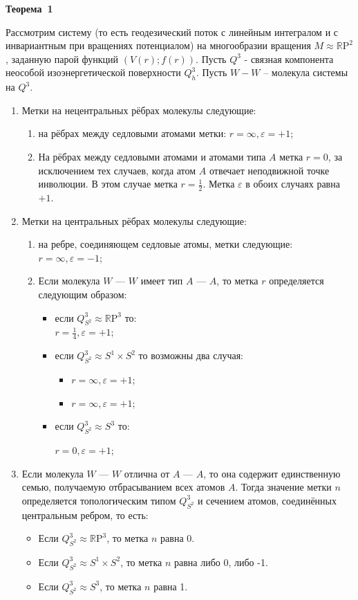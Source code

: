 \textbf{Теорема~1} \par
{Рассмотрим систему (то есть геодезический поток с линейным интегралом и с инвариантным при вращениях потенциалом) на многообразии вращения $M\approx \mathbb{R}\mathrm{P}^2$, заданную парой функций $(V(r);f(r))$.
Пусть $Q^3$ - связная компонента неособой изоэнергетической поверхности $Q^3_{h}$. Пусть $W -W$ -- молекула системы на $Q^3$.
\begin{enumerate}

\item Метки на нецентральных рёбрах молекулы следующие:
\begin{enumerate}
  \item на рёбрах между седловыми атомами метки: $r=\infty, \varepsilon=+1$;
 \item
  На рёбрах между седловыми атомами и атомами типа $A$ метка $r=0$, за исключением тех случаев, когда атом $A$ отвечает неподвижной точке инволюции. В этом случае метка $r=\frac{1}{2}$. Метка $\varepsilon$ в обоих случаях равна $+1$.
\end{enumerate}
\item Метки на центральных рёбрах молекулы следующие:
\begin{enumerate}
  \item
  на ребре, соединяющем седловые атомы, метки следующие: $r=\infty, \varepsilon=-1$;
  \item
  Если молекула $W$ --- $W$ имеет тип $A$ --- $A$, то метка $r$ определяется следующим образом:
  \begin{itemize}
  \item
  если $Q^{3}_{S^2}\approx \mathbb{R}\mathrm{P}^3$ то:
\\
  $r=\frac{1}{4}, \varepsilon=+1$;

\item
если $Q^{3}_{S^2}\approx S^1\times S^2$ то возможны два случая:
  \begin{itemize}
  \item  $r=\infty, \varepsilon=+1$;
  \item $r=\infty, \varepsilon=+1$;
    \end{itemize}
\item
если $Q^{3}_{S^2}\approx S^3$ то:
\par
 $r=0, \varepsilon=+1$;
  \end{itemize}
  \end{enumerate}
\item Если молекула $W$ --- $W$ отлична от $A$ --- $A$, то она содержит единственную семью, получаемую отбрасыванием всех атомов $A$. Тогда значение метки $n$ определяется топологическим типом $Q^{3}_{S^2}$ и сечением атомов, соединённых центральным ребром, то есть:
 \begin{itemize}
  \item Если $Q^{3}_{S^2}\approx \mathbb{R}\mathrm{P}^3$, то метка $n$ равна 0.
  \item Если  $Q^{3}_{S^2}\approx S^1\times S^2$, то метка $n$ равна либо 0, либо -1.
  \item Если  $Q^{3}_{S^2}\approx S^3$, то метка $n$ равна 1.
  \end{itemize}
  \end{enumerate}



}
